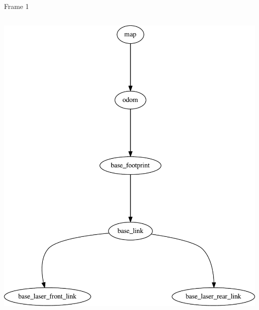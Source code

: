 \begin{frame}{Frame 1}
\begin{columns}
\begin{column}{0.5\textwidth}  %
\includegraphics[width=\textwidth]{slides/gfx/frames_cleaned}
\end{column}
\end{columns}

 
\end{frame}